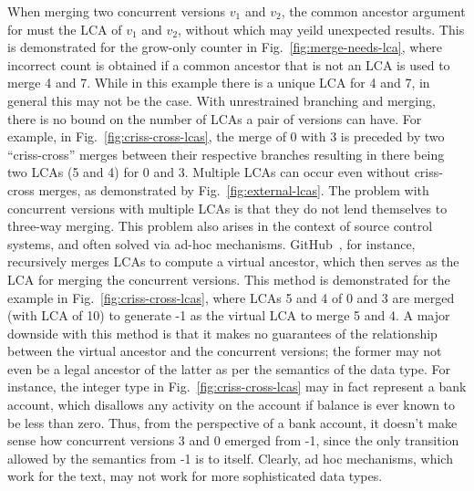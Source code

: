When merging two concurrent versions $v_1$ and $v_2$, the common
ancestor argument for  must the LCA of $v_1$ and $v_2$,
without which  may yeild unexpected results. This is
demonstrated for the grow-only counter in
Fig.~\ref{fig:merge-needs-lca}, where incorrect count is obtained if a
common ancestor that is not an LCA is used to merge 4 and 7. While in
this example there is a unique LCA for 4 and 7, in general this may
not be the case. With unrestrained branching and merging, there is no
bound on the number of LCAs a pair of versions can have.
For example, in
Fig.~\ref{fig:criss-cross-lcas}, the merge of 0 with 3 is preceded by
two ``criss-cross'' merges between their respective branches resulting
in there being two LCAs (5 and 4) for 0 and 3. Multiple LCAs can occur
even without criss-cross merges, as demonstrated by
Fig.~\ref{fig:external-lcas}. The problem with concurrent versions
with multiple LCAs is that they do not lend themselves to three-way
merging. This problem also arises in the context of source
control systems, and often solved via ad-hoc mechanisms.
GitHub~\cite{github}, for instance, recursively merges LCAs to compute
a virtual ancestor, which then serves as the LCA for merging the
concurrent versions. This method is demonstrated for the example in
Fig.~\ref{fig:criss-cross-lcas}, where LCAs 5 and 4 of 0 and 3 are
merged (with LCA of 10) to generate -1 as the virtual LCA to merge 5
and 4. A major downside with this method is that it makes no
guarantees of the relationship between the virtual ancestor and the
concurrent versions; the former may not even be a legal ancestor of
the latter as per the semantics of the data type. For instance, the
integer type in Fig.~\ref{fig:criss-cross-lcas} may in fact represent
a bank account, which disallows any activity on the account if balance
is ever known to be less than zero. Thus, from the perspective of a
bank account, it doesn't make sense how concurrent versions 3 and 0
emerged from -1, since the only transition allowed by the semantics
from -1 is to itself. Clearly, ad hoc mechanisms, which work for the
text, may not work for more sophisticated data types.

